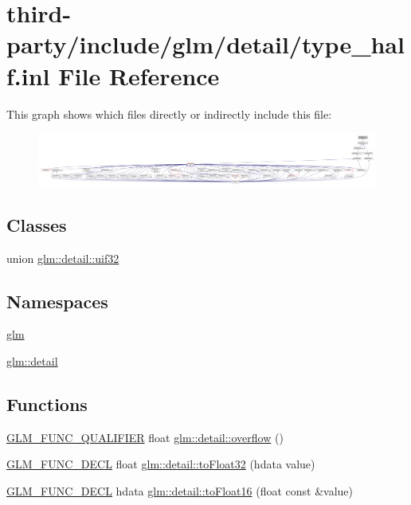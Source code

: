 \hypertarget{type__half_8inl}{}\section{third-\/party/include/glm/detail/type\+\_\+half.inl File Reference}
\label{type__half_8inl}
This graph shows which files directly or indirectly include this file\+:
\nopagebreak
\begin{figure}[H]
\begin{center}
\leavevmode
\includegraphics[width=350pt]{type__half_8inl__dep__incl}
\end{center}
\end{figure}
\subsection*{Classes}
\begin{DoxyCompactItemize}
\item 
union \hyperlink{unionglm_1_1detail_1_1uif32}{glm\+::detail\+::uif32}
\end{DoxyCompactItemize}
\subsection*{Namespaces}
\begin{DoxyCompactItemize}
\item 
 \hyperlink{namespaceglm}{glm}
\item 
 \hyperlink{namespaceglm_1_1detail}{glm\+::detail}
\end{DoxyCompactItemize}
\subsection*{Functions}
\begin{DoxyCompactItemize}
\item 
\hyperlink{setup_8hpp_a33fdea6f91c5f834105f7415e2a64407}{G\+L\+M\+\_\+\+F\+U\+N\+C\+\_\+\+Q\+U\+A\+L\+I\+F\+I\+ER} float \hyperlink{namespaceglm_1_1detail_a61efe122333bc00e81c57e0927bfdfb3}{glm\+::detail\+::overflow} ()
\item 
\hyperlink{setup_8hpp_ab2d052de21a70539923e9bcbf6e83a51}{G\+L\+M\+\_\+\+F\+U\+N\+C\+\_\+\+D\+E\+CL} float \hyperlink{namespaceglm_1_1detail_a8e4719d94d99ee1e625496e04317272b}{glm\+::detail\+::to\+Float32} (hdata value)
\item 
\hyperlink{setup_8hpp_ab2d052de21a70539923e9bcbf6e83a51}{G\+L\+M\+\_\+\+F\+U\+N\+C\+\_\+\+D\+E\+CL} hdata \hyperlink{namespaceglm_1_1detail_ac16321696a34b41c55f941b319d50652}{glm\+::detail\+::to\+Float16} (float const \&value)
\end{DoxyCompactItemize}
